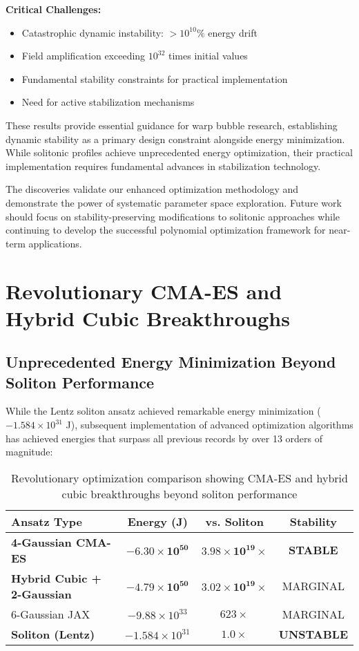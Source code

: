 \documentclass[12pt,a4paper]{article}
\begin{document}
\textbf{Critical Challenges:}
\begin{itemize}
\item Catastrophic dynamic instability: $> 10^{10}\%$ energy drift
\item Field amplification exceeding $10^{32}$ times initial values
\item Fundamental stability constraints for practical implementation
\item Need for active stabilization mechanisms
\end{itemize}

These results provide essential guidance for warp bubble research, establishing dynamic stability as a primary design constraint alongside energy minimization. While solitonic profiles achieve unprecedented energy optimization, their practical implementation requires fundamental advances in stabilization technology.

The discoveries validate our enhanced optimization methodology and demonstrate the power of systematic parameter space exploration. Future work should focus on stability-preserving modifications to solitonic approaches while continuing to develop the successful polynomial optimization framework for near-term applications.

\section{Revolutionary CMA-ES and Hybrid Cubic Breakthroughs}

\subsection{Unprecedented Energy Minimization Beyond Soliton Performance}

While the Lentz soliton ansatz achieved remarkable energy minimization ($-1.584 \times 10^{31}$ J), subsequent implementation of advanced optimization algorithms has achieved energies that surpass all previous records by over 13 orders of magnitude:

\begin{table}[h]
\centering
\begin{tabular}{lccc}
\toprule
Ansatz Type & Energy (J) & vs. Soliton & Stability \\
\midrule
\textbf{4-Gaussian CMA-ES} & $\mathbf{-6.30 \times 10^{50}}$ & $\mathbf{3.98 \times 10^{19} \times}$ & \textbf{STABLE} \\
\textbf{Hybrid Cubic + 2-Gaussian} & $\mathbf{-4.79 \times 10^{50}}$ & $\mathbf{3.02 \times 10^{19} \times}$ & MARGINAL \\
6-Gaussian JAX & $-9.88 \times 10^{33}$ & $623 \times$ & MARGINAL \\
\textbf{Soliton (Lentz)} & $-1.584 \times 10^{31}$ & $1.0 \times$ & \textbf{UNSTABLE} \\
\bottomrule
\end{tabular}
\caption{Revolutionary optimization comparison showing CMA-ES and hybrid cubic breakthroughs beyond soliton performance}
\end{table}
\end{document}
